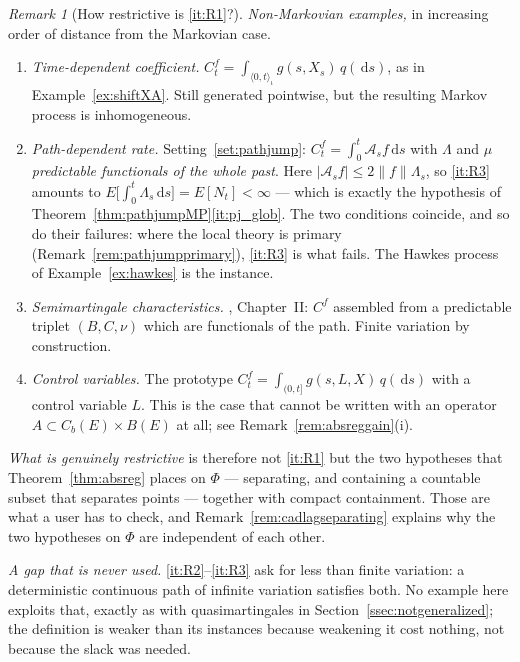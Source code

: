 \documentclass[11pt,a4paper]{article}
\theoremstyle{plain}
\theoremstyle{definition}
\theoremstyle{remark}
\newtheorem{remark}[theorem]{Remark}
\newcommand{\Bdd}{B}                           %
\newcommand{\Cb}{C_b}                          %
\newcommand{\dif}{\,\mathrm{d}}
\newcommand{\CPS}{\cite{CPS23}}
\newcommand{\JS}{\cite{JS03}}
\begin{document}
\begin{remark}[How restrictive is \ref{it:R1}?]
  \emph{Non-Markovian examples,} in increasing order of distance from the
  Markovian case.
  \begin{enumerate}[label=(\alph*)]
  \item \emph{Time-dependent coefficient.}
    $C^f_t = \int_{\langle 0,t\rangle_\iota} g(s,X_s)\,q(\dif s)$, as in
    Example~\ref{ex:shiftXA}.  Still generated pointwise, but the resulting
    Markov process is inhomogeneous.
  \item \emph{Path-dependent rate.}  Setting~\ref{set:pathjump}:
    $C^f_t = \int_0^t \mathcal{A}_s f \dif s$ with $\Lambda$ and $\mu$
    \emph{predictable functionals of the whole past}.  Here
    $|\mathcal{A}_sf| \leq 2\lVert f\rVert \Lambda_s$, so \ref{it:R3} amounts to
    $E\bigl[\int_0^t \Lambda_s \dif s\bigr] = E[N_t] < \infty$ --- which is
    exactly the hypothesis of Theorem~\ref{thm:pathjumpMP}\ref{it:pj_glob}.  The
    two conditions coincide, and so do their failures: where the local theory is
    primary (Remark~\ref{rem:pathjumpprimary}), \ref{it:R3} is what fails.  The
    Hawkes process of Example~\ref{ex:hawkes} is the instance.
  \item \emph{Semimartingale characteristics.}  \JS, Chapter~II: $C^f$ assembled
    from a predictable triplet $(B,C,\nu)$ which are functionals of the path.
    Finite variation by construction.
  \item \emph{Control variables.}  The \CPS{} prototype
    $C^f_t = \int_{(0,t]} g(s,L,X)\,q(\dif s)$ with a control variable $L$.  This
    is the case that cannot be written with an operator
    $A \subset \Cb(E)\times\Bdd(E)$ at all; see Remark~\ref{rem:absreggain}(i).
  \end{enumerate}

  \emph{What is genuinely restrictive} is therefore not \ref{it:R1} but the two
  hypotheses that Theorem~\ref{thm:absreg} places on $\Phi$ --- separating, and
  containing a countable subset that separates points --- together with compact
  containment.  Those are what a user has to check, and
  Remark~\ref{rem:cadlagseparating} explains why the two hypotheses on $\Phi$ are
  independent of each other.

  \emph{A gap that is never used.}  \ref{it:R2}--\ref{it:R3} ask for less than
  finite variation: a deterministic continuous path of infinite variation
  satisfies both.  No example here exploits that, exactly as with
  quasimartingales in Section~\ref{ssec:notgeneralized}; the definition is
  weaker than its instances because weakening it cost nothing, not because the
  slack was needed.
\end{remark}
\end{document}
